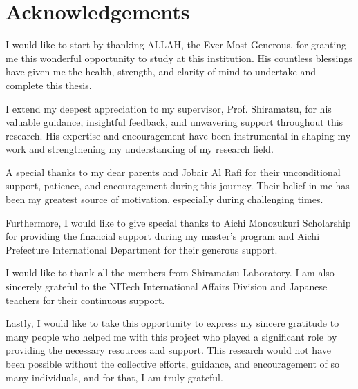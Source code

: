 \documentclass[Arial,12pt,openright,twoside]{book}
\begin{document}
\chapter*{Acknowledgements}

 I would like to start by thanking ALLAH, the Ever Most Generous, for granting me this wonderful opportunity to study at this institution. His countless blessings have given me the health, strength, and clarity of mind to undertake and complete this thesis.

I extend my deepest appreciation to my supervisor, Prof. Shiramatsu, for his valuable guidance, insightful feedback, and unwavering support throughout this research. His expertise and encouragement have been instrumental in shaping my work and strengthening my understanding of my research field. 

A special thanks to my dear parents and Jobair Al Rafi for their unconditional support, patience, and encouragement during this journey. Their belief in me has been my greatest source of motivation, especially during challenging times.

Furthermore, I would like to give special thanks to Aichi Monozukuri Scholarship for providing the financial support during my master’s program and Aichi Prefecture International Department for their generous support.

I would like to thank all the members from Shiramatsu Laboratory. I am also sincerely grateful to the NITech International Affairs Division  and Japanese teachers for their continuous support.

Lastly, I would like to take this opportunity to express my sincere gratitude to many people who helped me with this project who played a significant role by providing the necessary resources and support. This research would not have been possible without the collective efforts, guidance, and encouragement of so many individuals, and for that, I am truly grateful.



{}

\end{document}
